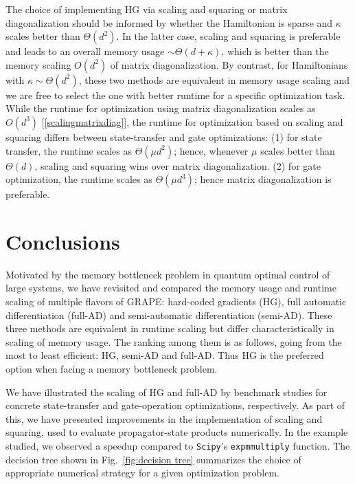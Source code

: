 \documentclass[letterpaper,10pt]{iopart}
\begin{document}
The choice of implementing HG via scaling and squaring or matrix diagonalization should be informed by whether the Hamiltonian is sparse and $\kappa$ scales better than $\Theta(d^2)$. In the latter case, scaling and squaring is preferable and leads to an overall memory usage $\sim \Theta(d+\kappa)$, which is better than the memory scaling $O(d^2)$ of matrix diagonalization. By contrast, for Hamiltonians with $\kappa\sim \Theta(d^2)$, these two methods are equivalent in memory usage scaling and we are free to select the one with better runtime for a specific optimization task. While the runtime for optimization using matrix diagonalization scales as $O(d^3)$ [\ref{scalingmatrixdiag}], the runtime for optimization based on scaling and squaring differs between state-transfer and gate optimizations: (1) for state transfer, the runtime scales as $\Theta(\mu d^2)$; hence, whenever $\mu$ scales better than $\Theta(d)$, scaling and squaring wins over matrix diagonalization. (2) for gate optimization, the runtime scales as $\Theta(\mu d^3)$; hence matrix diagonalization is preferable. 


\section{Conclusions \label{Conclusions}}

Motivated by the memory bottleneck problem in quantum optimal control of large systems, we have revisited and compared the memory usage and runtime scaling of multiple flavors of GRAPE: hard-coded gradients (HG), full automatic differentiation (full-AD) and semi-automatic differentiation (semi-AD). These three methods are equivalent in runtime scaling but differ characteristically in scaling of memory usage. The ranking among them is as follows, going from the most to least efficient: HG, semi-AD and full-AD. Thus HG is the preferred option when facing a memory bottleneck problem. 

We have illustrated the scaling of HG and full-AD by benchmark studies for concrete state-transfer and gate-operation optimizations, respectively. As part of this, we have presented improvements in the implementation of scaling and squaring, used to evaluate propagator-state products numerically. In the example studied, we observed a speedup compared to \texttt{Scipy}'s \texttt{expm\textunderscore multiply} function. The decision tree shown in Fig.\ \ref{fig:decision tree} summarizes the choice of appropriate numerical strategy for a given optimization problem.
\end{document}
